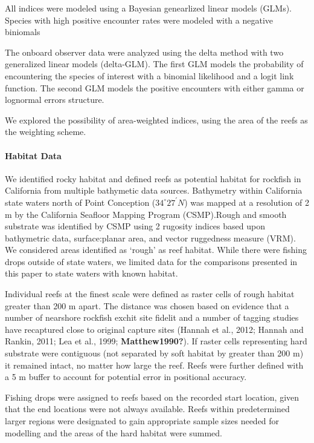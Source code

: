 \documentclass[]{elsarticle} %
\begin{document}
All indices were modeled using a Bayesian genearlized linear models
(GLMs). Species with high positive encounter rates were modeled with a
negative biniomals

The onboard observer data were analyzed using the delta method with two
generalized linear models (delta-GLM). The first GLM models the
probability of encountering the species of interest with a binomial
likelihood and a logit link function. The second GLM models the positive
encounters with either gamma or lognormal errors structure.

We explored the possibility of area-weighted indices, using the area of
the reefs as the weighting scheme.

\hypertarget{habitat-data}{%
\paragraph{Habitat Data}\label{habitat-data}}

We identified rocky habitat and defined reefs as potential habitat for
rockfish in California from multiple bathymetic data sources. Bathymetry
within California state waters north of Point Conception
(\(34^\circ 27^\prime N\)) was mapped at a resolution of 2 m by the
California Seafloor Mapping Program (CSMP).Rough and smooth substrate
was identified by CSMP using 2 rugosity indices based upon bathymetric
data, surface:planar area, and vector ruggedness measure (VRM). We
considered areas identified as `rough' as reef habitat. While there were
fishing drops outside of state waters, we limited data for the
comparisons presented in this paper to state waters with known habitat.

Individual reefs at the finest scale were defined as raster cells of
rough habitat greater than 200 m apart. The distance was chosen based on
evidence that a number of nearshore rockfish exchit site fidelit and a
number of tagging studies have recaptured close to original capture
sites (Hannah et al., 2012; Hannah and Rankin, 2011; Lea et al., 1999;
\textbf{Matthew1990?}). If raster cells representing hard substrate were
contiguous (not separated by soft habitat by greater than 200 m) it
remained intact, no matter how large the reef. Reefs were further
defined with a 5 m buffer to account for potential error in positional
accuracy.

Fishing drops were assigned to reefs based on the recorded start
location, given that the end locations were not always available. Reefs
within predetermined larger regions were designated to gain appropriate
sample sizes needed for modelling and the areas of the hard habitat were
summed.
\end{document}
